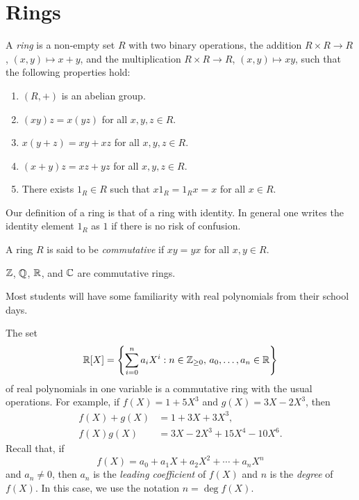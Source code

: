 \section{Rings}
\lecture\label{lec:Rings}


\begin{definition}
A \emph{ring} is a non-empty set $R$ with two binary operations, the addition
$R\times R\to R$, $(x,y)\mapsto x+y$, and the multiplication
$R\times R\to R$, $(x,y)\mapsto xy$, such that
the following properties hold:
\begin{enumerate}
    \item $(R,+)$ is an abelian group.
    \item $(xy)z=x(yz)$ for all $x,y,z\in R$.
    \item $x(y+z)=xy+xz$ for all $x,y,z\in R$.
    \item $(x+y)z=xz+yz$ for all $x,y,z\in R$.
    \item There exists $1_R\in R$ such that $x1_R=1_Rx=x$ for all $x\in R$.
\end{enumerate}
\end{definition}

Our definition of a ring is that of a ring with identity. In general one
writes the identity element $1_R$ as $1$ if there is no risk of confusion.

\begin{definition}
A ring $R$ is said to be \emph{commutative} if $xy=yx$ for all $x,y\in R$. 
\end{definition}

\begin{example}
$\mathbb{Z}$, $\mathbb{Q}$, $\mathbb{R}$, and $\mathbb{C}$ are commutative rings.
\end{example}

Most students will have some familiarity with
real polynomials from their school days. 

\begin{example}
    The set  
    \[
		\mathbb{R}[X]=\left\{\sum_{i=0}^na_iX^i:n\in\mathbb{Z}_{\geq0},\,a_0,\dots,a_n\in \mathbb{R}\right\}
    \]
    of real polynomials in one variable 
    is a commutative ring with the usual operations.  
    For example, if $f(X)=1+5X^3$ and $g(X)=3X-2X^3$, then
    \begin{align*}
        f(X)+g(X) &= 1+3X+3X^3,\\
        f(X)g(X) &= 3X-2X^3+15X^4-10X^6.
    \end{align*}
    Recall that, if 
    \[
    f(X)=a_0+a_1X+a_2X^2+\cdots+a_nX^n
    \]
    and $a_n\ne0$, then $a_n$ is the \emph{leading coefficient} of $f(X)$ and 
    $n$ is the \emph{degree} of $f(X)$. In this case, we use the notation 
    $n=\deg f(X)$. 
\end{example}

